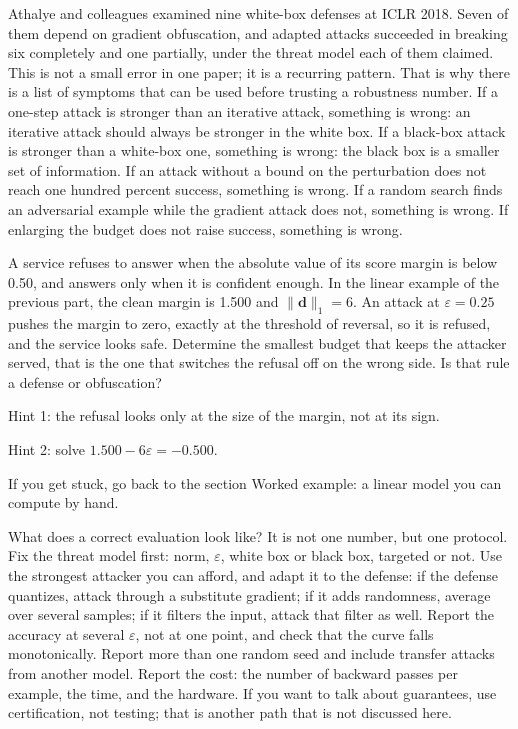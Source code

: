 Athalye and colleagues examined nine white-box defenses at ICLR 2018. Seven of them
depend on gradient obfuscation, and adapted attacks succeeded in breaking six
completely and one partially, under the threat model each of them claimed. This is not
a small error in one paper; it is a recurring pattern. That is why there is a list of
symptoms that can be used before trusting a robustness number. If a one-step attack is
stronger than an iterative attack, something is wrong: an iterative attack should
always be stronger in the white box. If a black-box attack is stronger than a white-box
one, something is wrong: the black box is a smaller set of information. If an attack
without a bound on the perturbation does not reach one hundred percent success,
something is wrong. If a random search finds an adversarial example while the gradient
attack does not, something is wrong. If enlarging the budget does not raise success,
something is wrong.

\begin{tantangan}
A service refuses to answer when the absolute value of its score margin is below 0.50,
and answers only when it is confident enough. In the linear example of the previous
part, the clean margin is 1.500 and $\lVert\mathbf{d}\rVert_1=6$. An attack at
$\varepsilon=0.25$ pushes the margin to zero, exactly at the threshold of reversal, so
it is refused, and the service looks safe. Determine the smallest budget that keeps
the attacker served, that is the one that switches the refusal off on the wrong side.
Is that rule a defense or obfuscation?

Hint 1: the refusal looks only at the size of the margin, not at its sign.

Hint 2: solve $1.500-6\varepsilon=-0.500$.

If you get stuck, go back to the section Worked example: a linear model you can compute
by hand.
\end{tantangan}

What does a correct evaluation look like? It is not one number, but one protocol. Fix
the threat model first: norm, $\varepsilon$, white box or black box, targeted or
not. Use the strongest attacker you can afford, and adapt it to the defense: if the
defense quantizes, attack through a substitute gradient; if it adds randomness,
average over several samples; if it filters the input, attack that filter as well.
Report the accuracy at several $\varepsilon$, not at one point, and check that the
curve falls monotonically. Report more than one random seed and include transfer
attacks from another model. Report the cost: the number of backward passes per
example, the time, and the hardware. If you want to talk about guarantees, use
certification, not testing; that is another path that is not discussed here.

